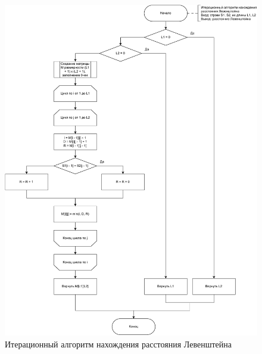\begin{figure}[H]
	\centering
	\includegraphics[scale=0.5]{img/lev_ifm.pdf}
	\caption{Итерационный алгоритм нахождения расстояния Левенштейна}
	\label{fig:lifm}
\end{figure}

